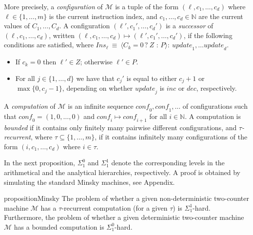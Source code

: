 \documentclass[a4paper,UKenglish,cleveref, autoref, thm-restate]{lipics-v2021}
\newcommand{\N}{\mathbb{N}}
\newcommand{\M}{\mathcal{M}}
\newcommand{\Ins}{\mathit{Ins}}
\newcommand{\update}{\textit{update}}
\newcommand{\Dec}{\textit{dec}}
\newcommand{\Inc}{\textit{inc}}
\newcommand{\conf}{\textit{conf}}
\newcommand{\fp}{Appendix}
\begin{document}
More precisely, a \emph{configuration} of $\M$ is a tuple of the form $(\ell,c_1,\ldots,c_d)$ where $\ell \in \{1,\ldots,m\}$ is the current instruction index, and $c_1,\ldots,c_d \in \N$ are the current values of $C_1,\ldots,C_d$. A configuration $(\ell',c_1',\ldots, c_d')$ is a \emph{successor} of $(\ell,c_1,\ldots,c_d)$, written $(\ell,c_1,\ldots,c_d) \mapsto (\ell',c_1',\ldots,c_d')$, if the following conditions are satisfied, where
$\Ins_\ell ~\equiv~ \langle C_k{=}0\, {?}\ Z \mbox{ : } P \rangle:\ \update_1,\ldots \update_d$.
\begin{itemize}
  \item If $c_k = 0$ then $\ell' \in Z$; otherwise $\ell' \in P$.
  \item For all $j \in \{1,\ldots,d\}$ we have that $c_j'$ is equal to either $c_j {+} 1$ or $\max\{0,c_j{-}1\}$, depending on whether $\update_j$ is $\Inc$ or $\Dec$, respectively.  
\end{itemize}
A \emph{computation} of $\M$ is an infinite sequence 
$\conf_0,\conf_1,\ldots$ of configurations such that $\conf_0 = (1,0,\ldots,0)$ and $\conf_i \mapsto \conf_{i+1}$ for all $i \in \N$. A computation is \emph{bounded} if it contains only finitely many pairwise different configurations, and \emph{$\tau$-recurrent}, where $\tau \subseteq \{1,\ldots,m\}$, if it contains infinitely many configurations of the form $(i,c_1,\ldots,c_d)$ where $i \in \tau$.


In the next proposition, $\Sigma_1^0$ and $\Sigma_1^1$ denote the corresponding levels in the arithmetical and the analytical hierarchies, respectively. A proof is obtained by simulating the standard Minsky machines, see \fp.

\begin{restatable}{proposition}{Minsky}
\label{prop-twocounter}
   The problem of whether a given non-deterministic two-counter machine $\M$ has a 
   $\tau$-recurrent computation (for a given $\tau$) is $\Sigma_1^1$-hard. Furthermore, the problem of whether a given deterministic two-counter machine 
   $\M$ has a bounded computation is $\Sigma_1^0$-hard. 
\end{restatable}
\end{document}
